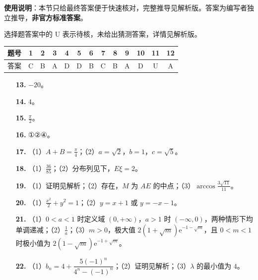 
\begin{gknotice}
\textbf{使用说明}：本节只给最终答案便于快速核对，完整推导见解析版。答案为编写者独立推导，\textbf{非官方标准答案}。
\end{gknotice}

\begin{gknotice}
选择题答案中的 U 表示待核，未给出猜测答案，详情见解析版。
\end{gknotice}

\begin{center}\begin{tabular}{ccccccccccccc}
\toprule
题号 & 1 & 2 & 3 & 4 & 5 & 6 & 7 & 8 & 9 & 10 & 11 & 12 \\
\midrule
答案 & C & B & A & D & D & B & C & B & A & D & U & A \\
\bottomrule
\end{tabular}\end{center}

\begin{itemize}[leftmargin=2.6em]
  \item[\textbf{13.}] $-20$。
  \item[\textbf{14.}] $4$。
  \item[\textbf{15.}] $\frac{\pi}{2}$。
  \item[\textbf{16.}] ①②④。
\end{itemize}

\begin{itemize}[leftmargin=2.6em]
  \item[\textbf{17.}] （1）$A+B=\frac\pi4$；（2）$a=\sqrt2$，$b=1$，$c=\sqrt5$。
  \item[\textbf{18.}] （1）$\frac{36}{85}$；（2）分布列见下，$E\xi=2$。
  \item[\textbf{19.}] （1）证明见解析；（2）存在，$M$ 为 $AE$ 的中点；（3）$\arccos\frac{3\sqrt{11}}{11}$。
  \item[\textbf{20.}] （1）$\frac{x^2}{2}+y^2=1$；（2）$y=x+1$ 或 $y=-x-1$。
  \item[\textbf{21.}] （1）$0<a<1$ 时定义域 $(0,+\infty)$，$a>1$ 时 $(-\infty,0)$，两种情形下均单调递减；（2）$\frac1a$；（3）$m>0$，极大值 $2(1+\sqrt m)\mathrm e^{-1-\sqrt m}$，且 $0<m<1$ 时极小值为 $2(1-\sqrt m)\mathrm e^{-1+\sqrt m}$。
  \item[\textbf{22.}] （1）$b_n=4+\dfrac{5(-1)^n}{4^n-(-1)^n}$；（2）证明见解析；（3）$\lambda$ 的最小值为 $4$。
\end{itemize}
